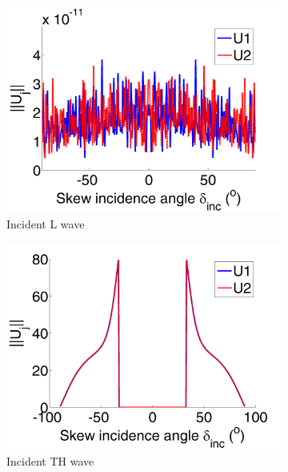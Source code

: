 \begin{figure}[h]
\centering
\begin{subfigure}[b]{0.32\textwidth}
        \includegraphics[width=\textwidth]{images/chapter4/Resultats_3D/U1L_180_50.png}
        \caption{Incident L wave}
        \label{Resultat_3D:U1L}
    \end{subfigure}
\begin{subfigure}[b]{0.32\textwidth}
        \includegraphics[width=\textwidth]{images/chapter4/Resultats_3D/U1TH_180_50.png}
        \caption{Incident TH wave}
        \label{Resultat_3D:U1TH}
    \end{subfigure}
   \begin{subfigure}[b]{0.32\textwidth}

\end{subfigure}
\end{figure}
